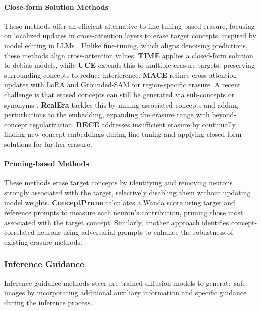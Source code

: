 \paragraph{Close-form Solution Methods} 
These methods offer an efficient alternative to fine-tuning-based erasure, focusing on localized updates in cross-attention layers to erase target concepts, inspired by model editing in LLMs \cite{meng2022mass}. Unlike fine-tuning, which aligns denoising predictions, these methods align cross-attention values. 
\textbf{TIME} \cite{orgad2023editing} applies a closed-form solution to debias models, while \textbf{UCE} \cite{gandikota2024unified} extends this to multiple erasure targets, preserving surrounding concepts to reduce interference. \textbf{MACE} \cite{lu2024mace} refines cross-attention updates with LoRA and Grounded-SAM \cite{kirillov2023segment,liu2023grounding} for region-specific erasure. A recent challenge is that erased concepts can still be generated via sub-concepts or synonyms \cite{liu2024realera}.
\textbf{RealEra} \cite{liu2024realera} tackles this by mining associated concepts and adding perturbations to the embedding, expanding the erasure range with beyond-concept regularization. 
\textbf{RECE} \cite{gong2024reliable} addresses insufficient erasure by continually finding new concept embeddings during fine-tuning and applying closed-form solutions for further erasure.

\paragraph{Pruning-based Methods} 
These methods erase target concepts by identifying and removing neurons strongly associated with the target, selectively disabling them without updating model weights.
\textbf{ConceptPrune} calculates a Wanda score using target and reference prompts to measure each neuron's contribution, pruning those most associated with the target concept. Similarly, another approach \cite{yang2024pruning} identifies concept-correlated neurons using adversarial prompts to enhance the robustness of existing erasure methods.


\subsubsection{Inference Guidance} 
Inference guidance methods steer pre-trained diffusion models to generate safe images by incorporating additional auxiliary information and specific guidance during the inference process.
 
